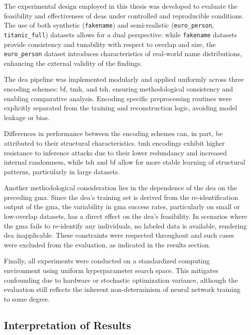 The experimental design employed in this thesis was developed to evaluate the feasibility and effectiveness of \ac{dea}s under controlled and reproducible conditions.
The use of both synthetic (\texttt{fakename}) and semi-realistic (\texttt{euro\_person}, \texttt{titanic\_full}) datasets allows for a dual perspective: while \texttt{fakename} datasets provide consistency and tunability with respect to overlap and size, the \texttt{euro\_person} dataset introduces characteristics of real-world name distributions, enhancing the external validity of the findings.

The \ac{dea} pipeline was implemented modularly and applied uniformly across three encoding schemes: \ac{bf}, \ac{tmh}, and \ac{tsh}, ensuring methodological consistency and enabling comparative analysis.
Encoding specific preprocessing routines were explicitly separated from the training and reconstruction logic, avoiding model leakage or bias.

Differences in performance between the encoding schemes can, in part, be attributed to their structural characteristics.
\ac{tmh} encodings exhibit higher resistance to inference attacks due to their lower redundancy and increased internal randomness, while \ac{tsh} and \ac{bf} allow for more stable learning of structural patterns, particularly in large datasets.

Another methodological consideration lies in the dependence of the \ac{dea} on the preceding \ac{gma}.
Since the \ac{dea}'s training set is derived from the re-identification output of the \ac{gma}, the variability in \ac{gma} success rates, particularly on small or low-overlap datasets, has a direct effect on the \ac{dea}'s feasibility.
In scenarios where the \ac{gma} fails to re-identify any individuals, no labeled data is available, rendering \ac{dea} inapplicable.
These constraints were respected throughout and such cases were excluded from the evaluation, as indicated in the results section.

Finally, all experiments were conducted on a standardized computing environment using uniform hyperparameter search space.
This mitigates confounding due to hardware or stochastic optimization variance, although the evaluation still reflects the inherent non-determinism of neural network training to some degree.


\subsection{Interpretation of Results}

